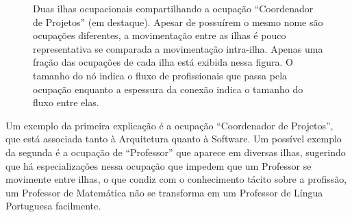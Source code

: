 \documentclass[
  article,
  11pt,
  a4paper,
  english,
  brazil,
  sumario=tradicional]{abntex2}
\begin{document}
\begin{figure}[htb]
    \centering
    \caption{Duas ilhas ocupacionais compartilhando a ocupação \enquote{Coordenador de Projetos} (em destaque). Apesar de possuírem o mesmo nome são ocupações diferentes, a movimentação entre as ilhas é pouco representativa se comparada a movimentação intra-ilha. Apenas uma fração das ocupações de cada ilha está exibida nessa figura. O tamanho do nó indica o fluxo de profissionais que passa pela ocupação enquanto a espessura da conexão indica o tamanho do fluxo entre elas.}
    \label{fig:homonimos}
\end{figure}

Um exemplo da primeira explicação é a ocupação \enquote{Coordenador de Projetos}, que está associada tanto à Arquitetura quanto à Software. Um possível exemplo da segunda é a ocupação de \enquote{Professor} que aparece em diversas ilhas, sugerindo que há especializações nessa ocupação que impedem que um Professor se movimente entre ilhas, o que condiz com o conhecimento tácito sobre a profissão, um Professor de Matemática não se transforma em um Professor de Língua Portuguesa facilmente.
\end{document}
